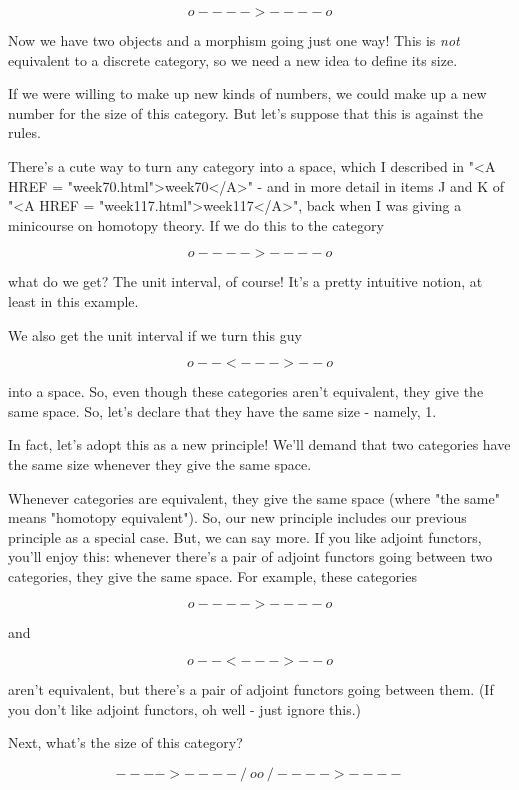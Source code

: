 $$
                     o---->----o
$$
    
Now we have two objects and a morphism going just one way!  
This is \emph{not} equivalent to a discrete category, so we need 
a new idea to define its size.  

If we were willing to make up new kinds of numbers, we could
make up a new number for the size of this category.  But let's
suppose that this is against the rules.  

There's a cute way to turn any category into a space, which I
described in "<A HREF = "week70.html">week70</A>" - and in
more detail in items J and K of "<A HREF =
"week117.html">week117</A>", back when I was giving a minicourse
on homotopy theory.  If we do this to the category

$$
                     o---->----o
$$
    
what do we get?  The unit interval, of course!   It's a pretty
intuitive notion, at least in this example.  

We also get the unit interval if we turn this guy 

$$
                     o--<--->--o
$$
    
into a space.  So, even though these categories aren't equivalent,
they give the same space.  So, let's declare that they have the 
same size - namely, 1.

In fact, let's adopt this as a new principle!   We'll demand that 
two categories have the same size whenever they give the same space.

Whenever categories are equivalent, they give the same space (where
"the same" means "homotopy equivalent").  So, our
new principle includes our previous principle as a special case.  But,
we can say more.  If you like adjoint functors, you'll enjoy this:
whenever there's a pair of adjoint functors going between two
categories, they give the same space.  For example, these categories

$$
                     o---->----o
$$
    
and

$$
                     o--<--->--o
$$
    
aren't equivalent, but there's a pair of adjoint functors going between 
them.  (If you don't like adjoint functors, oh well - just ignore this.)

Next, what's the size of this category?

$$
                     ---->---- 
                    /         \
                   o           o
                    \         /
                     ---->----
$$
    
